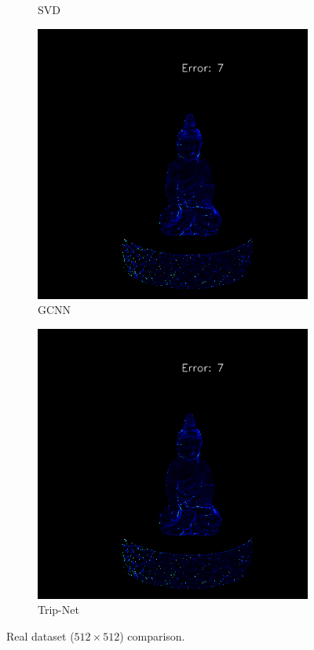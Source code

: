 \begin{figure}[th]
\begin{subfigure}[b]{0.2\linewidth}
		\caption{SVD}
	\end{subfigure}	
	\begin{subfigure}[b]{0.2\linewidth}
		\includegraphics[width=\linewidth]{./Figures/comparison_real/fancy_eval_0_error_NNNN-512.png}
		\caption{GCNN}
	\end{subfigure}
	\begin{subfigure}[b]{0.2\linewidth}
		\includegraphics[width=\linewidth]{./Figures/comparison_real/fancy_eval_0_error_An2-real-resume.png}
		\caption{Trip-Net}
	\end{subfigure}	
	\decoRule
	\caption{Real dataset ($ 512\times 512 $) comparison.}
	\label{fig:real_eval_compare}
\end{figure}
